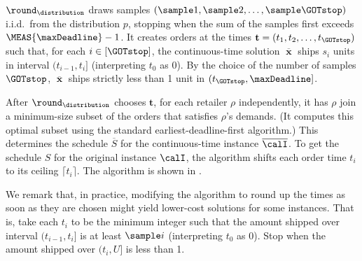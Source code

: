 $\round_\distribution$ draws samples $(\sample 1, \sample 2, \ldots, \sample \GOTstop)$
i.i.d.~from the distribution $p$, 
stopping when the sum of the samples first exceeds $\MEAS{\maxDeadline}-1$.
It creates orders at the times $\mathbf t = (t_1,t_2,\ldots,t_{\GOTstop})$
such that, for each $i\in[\GOTstop]$,
the continuous-time solution $\overline\mbfx$ 
ships $s_i$ units in interval $(t_{i-1},t_i]$ (interpreting $t_0$ as 0).
By the choice of the number of samples ${\GOTstop}$,
$\overline\mbfx$ ships strictly less than 1 unit in $(t_{\GOTstop},\maxDeadline]$.

After $\round_\distribution$ chooses $\mathbf t$, 
for each retailer $\rho$ independently,
it has $\rho$ join a minimum-size subset of the orders that satisfies $\rho$'s demands.
(It computes this optimal subset using the standard earliest-deadline-first algorithm.)
This determines the schedule $\overline S$ for the continuous-time instance $\overline\calI$.
To get the schedule $S$ for the original instance $\calI$,
the algorithm shifts each order time $t_i$ to its ceiling $\lceil t_i\rceil$.
The algorithm is shown in .

We remark that, in practice, modifying the algorithm to round up 
the times as soon as they are chosen might yield lower-cost solutions for some instances.  
That is, take each $t_i$ to be the minimum integer such that the amount shipped over 
interval $(t_{i-1}, t_i]$ is at least $\sample i$ (interpreting $t_0$ as $0$).  
Stop when the amount shipped over $(t_i, U]$ is less than 1.



\newcommand{\StateLong}[1]
{\State\parbox[t]{\dimexpr\linewidth-\algorithmicindent}{#1 \strut}}

